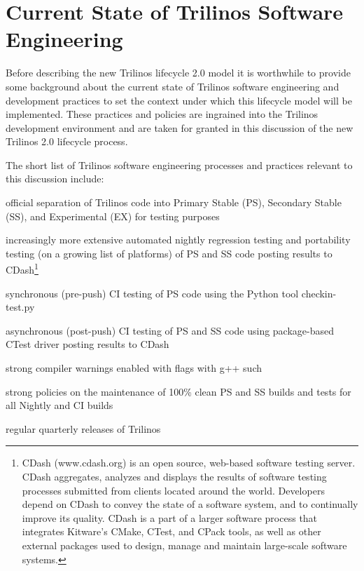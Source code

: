 \documentclass[11pt]{SANDreport}
\begin{document}
%
{}\section{Current State of Trilinos Software Engineering}
\label{sec:trilinos_current_state}
%

Before describing the new Trilinos lifecycle 2.0 model it is worthwhile
to provide some background about the current state of Trilinos
software engineering and development practices to set the context
under which this lifecycle model will be implemented.  These
practices and policies are ingrained into the Trilinos development
environment and are taken for granted in this discussion of the new
Trilinos 2.0 lifecycle process.

The short list of Trilinos software engineering processes and
practices relevant to this discussion include:
%
\begin{compactitem}
%
{}\item official separation of Trilinos code into Primary
Stable (PS), Secondary Stable (SS), and Experimental (EX) for testing
purposes
%
{}\item increasingly more extensive automated nightly regression
testing and portability testing (on a growing list of platforms) of PS
and SS code posting results to CDash\footnote{CDash (www.cdash.org) is
an open source, web-based software testing server. CDash aggregates,
analyzes and displays the results of software testing processes
submitted from clients located around the world. Developers depend on
CDash to convey the state of a software system, and to continually
improve its quality. CDash is a part of a larger software process that
integrates Kitware's CMake, CTest, and CPack tools, as well as other
external packages used to design, manage and maintain large-scale
software systems.}
%
{}\item synchronous (pre-push) CI testing of PS code using the Python
tool checkin-test.py
%
{}\item asynchronous (post-push) CI testing of PS and SS code using
package-based CTest driver posting results to CDash
%
{}\item strong compiler warnings enabled with flags with g++ such
{}
%
{}\item strong policies on the maintenance of 100\% clean PS and SS
builds and tests for all Nightly and CI builds
%
{}\item regular quarterly releases of Trilinos
%
\end{compactitem}
\end{document}
